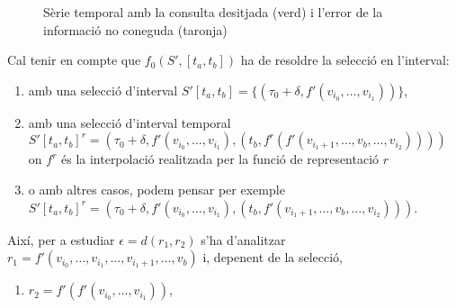 \begin{example}
\begin{itemize}
\begin{figure}[tp]

      \caption{Sèrie temporal amb la consulta desitjada (verd) i l'error de la
        informació no coneguda (taronja)}
  \label{fig:multiresolucio:informacio-subresolucions}
\end{figure}




  Cal tenir en compte que $f_0(S',[t_a,t_b])$ ha de resoldre la
  selecció en l'interval: 
  \begin{enumerate}
  \item amb una selecció d'interval $S'[t_a,t_b]=\{ (\tau_0+\delta,
    f'(v_{i_0},\dotsc,v_{i_1}) ) \}$,

  \item amb una selecció d'interval temporal
    $S'[t_a,t_b]^r=(\tau_0+\delta, f'(v_{i_0},\dotsc,v_{i_1}), (t_b,
    f^r(f'(v_{i_1+1},\dotsc,v_{b} ,\dotsc,v_{i_2}))) ) $ on $f^r$ és
    la interpolació realitzada per la funció de representació $r$

  \item o amb altres casos, podem pensar per exemple
    $S'[t_a,t_b]^r=(\tau_0+\delta, f'(v_{i_0},\dotsc,v_{i_1}), (t_b,
    f'(v_{i_1+1},\dotsc,v_{b} ,\dotsc,v_{i_2})) )$.
   \end{enumerate}



  Així, per a estudiar $\epsilon=d(r_1,r_2)$ s'ha d'analitzar
  $r_1=f'(v_{i_0},\dotsc,v_{i_1},\dotsc, v_{i_1+1},\dotsc,v_{b})$ i,
  depenent de la selecció,
   \begin{enumerate}
   \item $r_2=f'(f'(v_{i_0},\dotsc,v_{i_1}))$, 


\end{enumerate}
\end{itemize}
\end{example}
